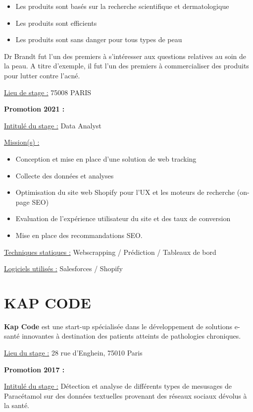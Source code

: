 \documentclass[
  letterpaper,
  DIV=11,
  numbers=noendperiod]{scrreprt}
\begin{document}
\begin{itemize}
\item
  Les produits sont basés sur la recherche scientifique et
  dermatologique
\item
  Les produits sont efficients
\item
  Les produits sont sans danger pour tous types de peau
\end{itemize}

Dr Brandt fut l'un des premiers à s'intéresser aux questions relatives
au soin de la peau. A titre d'exemple, il fut l'un des premiers à
commercialiser des produits pour lutter contre l'acné.

\uline{Lieu de stage :} 75008 PARIS

\textbf{Promotion 2021 :}

\uline{Intitulé du stage :} Data Analyst

\uline{Mission(s) :}

\begin{itemize}
\item
  Conception et mise en place d'une solution de web tracking
\item
  Collecte des données et analyses
\item
  Optimisation du site web Shopify pour l'UX et les moteurs de recherche
  (on-page SEO)
\item
  Evaluation de l'expérience utilisateur du site et des taux de
  conversion
\item
  Mise en place des recommandations SEO.
\end{itemize}

\uline{Techniques statiques :} Webscrapping / Prédiction / Tableaux de
bord

\uline{Logiciels utilisés :} Salesforces / Shopify

\hypertarget{kap-code}{%
\section{\texorpdfstring{\textbf{KAP CODE}}{KAP CODE}}\label{kap-code}}

\textbf{Kap Code} est une start-up spécialisée dans le développement de
solutions e-santé innovantes à destination des patients atteints de
pathologies chroniques.

\uline{Lieu du stage :} 28 rue d'Enghein, 75010 Paris

\textbf{Promotion 2017 :}

\uline{Intitulé du stage :} Détection et analyse de différents types de
mesusages de Paracétamol sur des données textuelles provenant des
réseaux sociaux dévolus à la santé.
\end{document}
